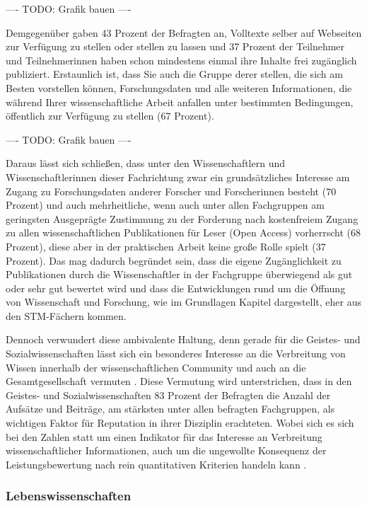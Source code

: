 ---- TODO: Grafik bauen ----

Demgegenüber gaben 43 Prozent der Befragten an, Volltexte selber auf Webseiten zur Verfügung zu stellen oder stellen zu lassen und 37 Prozent der Teilnehmer und Teilnehmerinnen haben schon mindestens einmal ihre Inhalte frei zugänglich publiziert. Erstaunlich ist, dass Sie auch die Gruppe derer stellen, die sich am Besten vorstellen können, Forschungsdaten und alle weiteren Informationen, die während Ihrer wissenschaftliche Arbeit anfallen unter bestimmten Bedingungen, öffentlich zur Verfügung zu stellen (67 Prozent).

---- TODO: Grafik bauen  ----

Daraus lässt sich schließen, dass unter den Wissenschaftlern und Wissenschaftlerinnen dieser Fachrichtung zwar ein grundsätzliches Interesse am Zugang zu Forschungsdaten anderer Forscher und Forscherinnen besteht (70 Prozent) und auch mehrheitliche, wenn auch unter allen Fachgruppen am geringsten Ausgeprägte Zustimmung zu der Forderung nach kostenfreiem Zugang zu allen wissenschaftlichen Publikationen für Leser (Open Access) vorherrscht (68 Prozent), diese aber in der praktischen Arbeit keine große Rolle spielt (37 Prozent). Das mag dadurch begründet sein, dass die eigene Zugänglichkeit zu Publikationen durch die Wissenschaftler in der Fachgruppe überwiegend als gut oder sehr gut bewertet wird und dass die Entwicklungen rund um die Öffnung von Wissenschaft und Forschung, wie im Grundlagen Kapitel dargestellt, eher aus den STM-Fächern kommen.

Dennoch verwundert diese ambivalente Haltung, denn gerade für die Geistes- und Sozialwissenschaften lässt sich ein besonderes Interesse an die Verbreitung von Wissen innerhalb der wissenschaftlichen Community und auch an die Gesamtgesellschaft vermuten \cite{suchen}. Diese Vermutung wird unterstrichen, dass in den Geistes- und Sozialwissenschaften 83 Prozent der Befragten die Anzahl der Aufsätze und Beiträge, am stärksten unter allen befragten Fachgruppen, als wichtigen Faktor für Reputation in ihrer Disziplin erachteten. Wobei sich es sich bei den Zahlen statt um einen Indikator für das Interesse an Verbreitung wissenschaftlicher Informationen, auch um die ungewollte Konsequenz der Leistungsbewertung nach rein quantitativen Kriterien handeln kann \cite{wr_2015_wissenschaft_integritaet}.

\subsubsection{Lebenswissenschaften}

